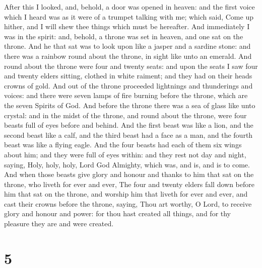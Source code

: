  After this I looked, and, behold, a door was opened in
heaven: and the first voice which I heard was as it were of a trumpet
talking with me; which said, Come up hither, and I will shew thee things
which must be hereafter.  And immediately I was in the
spirit: and, behold, a throne was set in heaven, and one sat on the
throne.  And he that sat was to look upon like a jasper and
a sardine stone: and there was a rainbow round about the throne, in
sight like unto an emerald.  And round about the throne were
four and twenty seats: and upon the seats I saw four and twenty elders
sitting, clothed in white raiment; and they had on their heads crowns of
gold.  And out of the throne proceeded lightnings and
thunderings and voices: and there were seven lamps of fire burning
before the throne, which are the seven Spirits of God.  And
before the throne there was a sea of glass like unto crystal: and in the
midst of the throne, and round about the throne, were four beasts full
of eyes before and behind.  And the first beast was like a
lion, and the second beast like a calf, and the third beast had a face
as a man, and the fourth beast was like a flying eagle.  And
the four beasts had each of them six wings about him; and they were full
of eyes within: and they rest not day and night, saying, Holy, holy,
holy, Lord God Almighty, which was, and is, and is to come. 
And when those beasts give glory and honour and thanks to him that sat
on the throne, who liveth for ever and ever,  The four and
twenty elders fall down before him that sat on the throne, and worship
him that liveth for ever and ever, and cast their crowns before the
throne, saying,  Thou art worthy, O Lord, to receive glory
and honour and power: for thou hast created all things, and for thy
pleasure they are and were created.

\hypertarget{section-4}{%
\section{5}\label{section-4}}

